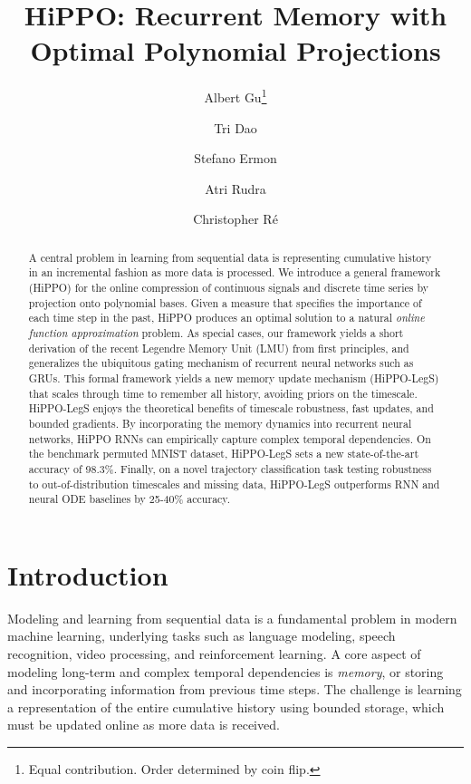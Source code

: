 \documentclass{article}
\title{HiPPO: Recurrent Memory with Optimal Polynomial Projections}
\author[]{Albert Gu\thanks{Equal contribution. Order determined by coin flip.}}
\author[]{Tri Dao\samethanks}
\author[]{Stefano Ermon}
\author[]{Atri Rudra}
\author[]{Christopher R{\'e}}
\affil[]{Department of Computer Science, Stanford University}
\affil[]{Department of Computer Science and Engineering, University at Buffalo, SUNY\vspace{4pt}}
\affil[ ]{{\texttt{\{albertgu,trid\}@stanford.edu}, \texttt{ermon@cs.stanford.edu}, \texttt{atri@buffalo.edu}, \texttt{chrismre@cs.stanford.edu}}}
\begin{document}
\maketitle

\begin{abstract}
  A central problem in learning from sequential data is representing cumulative
  history in an incremental fashion as more data is processed.
  We introduce a general framework (HiPPO) for the online compression of continuous signals and discrete time series
  by projection onto polynomial bases.
  Given a measure that specifies the importance of each time step in the past,
  HiPPO produces an optimal solution to a natural \emph{online function approximation} problem.
  As special cases, our framework yields a short derivation of the recent Legendre Memory Unit (LMU) from first principles,
  and generalizes the ubiquitous gating mechanism of recurrent neural networks such as GRUs.
  This formal framework yields a new memory update mechanism (HiPPO-LegS) that scales
  through time to remember all history, avoiding priors on the timescale.
  HiPPO-LegS enjoys the theoretical benefits of timescale robustness, fast updates,
  and bounded gradients.
  By incorporating the memory dynamics into recurrent neural networks, HiPPO RNNs can
  empirically capture complex temporal dependencies.
  On the benchmark permuted MNIST dataset, HiPPO-LegS sets a new
  state-of-the-art accuracy of 98.3\%.
  Finally, on a novel trajectory classification task testing robustness to out-of-distribution timescales and missing data, HiPPO-LegS outperforms RNN and neural ODE baselines by 25-40\% accuracy.
\end{abstract}




\section{Introduction}
\label{sec:intro}

  Modeling and learning from sequential data is a fundamental problem in
  modern machine learning, underlying tasks such as language modeling, speech
  recognition, video processing, and reinforcement learning.
  A core aspect of modeling long-term and complex temporal dependencies is \emph{memory}, or
  storing and incorporating information from previous time steps.
  The challenge is learning a representation of the entire cumulative history using bounded storage,
  which must be updated online as more data is received.
  
\end{document}
